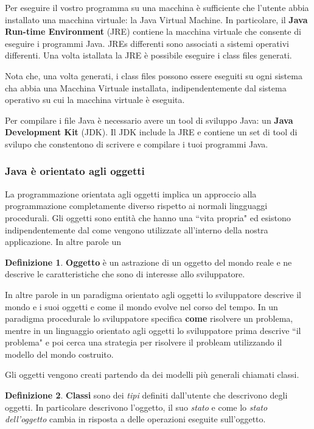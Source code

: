 \documentclass{article}
\theoremstyle{definition}
\newtheorem{mydef}{Definizione}
\begin{document}
Per eseguire il vostro programma su una macchina \`e sufficiente che l'utente abbia installato una macchina virtuale: la Java Virtual Machine. 
In particolare, il \textbf{Java Run-time Environment} (JRE) contiene la macchina virtuale che consente di eseguire i programmi Java.  
JREs differenti sono associati a sistemi operativi differenti. 
Una volta istallata la JRE \`e possibile eseguire i class files generati.

Nota che, una volta generati, i class files possono essere eseguiti su ogni sistema cha abbia una Macchina Virtuale installata, indipendentemente dal sistema operativo su cui la macchina virtuale \`e eseguita.

Per compilare i file Java \`e necessario avere un tool di sviluppo Java: un \textbf{Java Development Kit} (JDK). 
Il JDK include la JRE e contiene un set di tool di svilupo che constentono di scrivere e compilare i tuoi programmi Java.




\subsubsection{Java \`e orientato agli oggetti}
La programmazione orientata agli oggetti implica un approccio alla programmazione completamente diverso rispetto ai normali lingguaggi procedurali. Gli oggetti sono entit\`a che hanno una ``vita propria" ed esistono indipendentemente dal come vengono utilizzate all'interno della nostra applicazione. In altre parole un 

\begin{mydef} \textbf{Oggetto} \`e un astrazione di un oggetto del mondo reale e ne descrive le caratteristiche  che sono di interesse allo sviluppatore.
\end{mydef}

In altre parole in un paradigma orientato agli oggetti lo sviluppatore descrive il mondo e i suoi oggetti e come il mondo evolve nel corso del tempo. 
In un paradigma procedurale lo sviluppatore specifica \textbf{come} risolvere un problema, mentre in un linguaggio orientato agli oggetti lo sviluppatore prima descrive ``il problema" e poi cerca una strategia per risolvere il probleam utilizzando il modello del mondo costruito.

Gli oggetti vengono creati partendo da dei modelli pi\`u generali chiamati classi. 

\begin{mydef} \textbf{Classi} sono dei \emph{tipi} definiti dall'utente che descrivono degli oggetti. In particolare descrivono l'oggetto, il suo \emph{stato} e come lo \emph{stato dell'oggetto} cambia in risposta a delle operazioni eseguite sull'oggetto.
\end{mydef}
\end{document}
